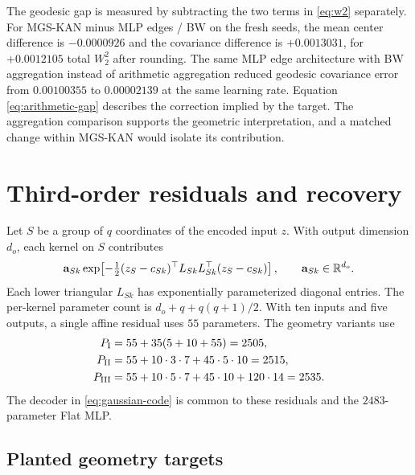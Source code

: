 \documentclass[11pt]{article}
\let\StudyMathSection\section
\let\StudyMathSubsection\subsection
\newcommand{\R}{\mathbb{R}}
\begin{document}
The geodesic gap is measured by subtracting the two terms in
\eqref{eq:w2} separately. For MGS-KAN minus MLP edges / BW on the fresh
seeds, the mean center difference is \(-0.0000926\) and the covariance
difference is \(+0.0013031\), for \(+0.0012105\) total \(W_2^2\) after
rounding. The same MLP edge architecture with BW aggregation instead of
arithmetic aggregation reduced geodesic covariance error from
\(0.00100355\) to \(0.00002139\) at the same learning rate. Equation
\eqref{eq:arithmetic-gap} describes the correction implied by the target.
The aggregation comparison supports the geometric interpretation, and a
matched change within MGS-KAN would isolate its contribution.

\StudyMathSection{Third-order residuals and recovery}
\label{app:hyperedge-math}

Let \(S\) be a group of \(q\) coordinates of the encoded input \(z\).
With output dimension \(d_o\), each kernel on \(S\) contributes
\begin{equation}
 {\bf a}_{Sk}\exp\!\left[-\tfrac12(z_S-c_{Sk})^\top
                  L_{Sk}L_{Sk}^\top(z_S-c_{Sk})\right],
 \qquad {\bf a}_{Sk}\in\R^{d_o}.
 \label{eq:hyperedge-vector}
\end{equation}
Each lower triangular \(L_{Sk}\) has exponentially parameterized
diagonal entries. The per-kernel parameter count is
\(d_o+q+q(q+1)/2\). With ten inputs and five outputs, a single affine
residual uses \(55\) parameters. The geometry variants use
\begin{align*}
 P_{\rm I} &=55+35(5+10+55)=2505,\\
 P_{\rm II} &=55+10\cdot3\cdot7+45\cdot5\cdot10=2515,\\
 P_{\rm III} &=55+10\cdot5\cdot7+45\cdot10+120\cdot14=2535 .
\end{align*}
The decoder in \eqref{eq:gaussian-code} is common to these residuals and
the \(2483\)-parameter Flat MLP.

\StudyMathSubsection{Planted geometry targets}
\end{document}
